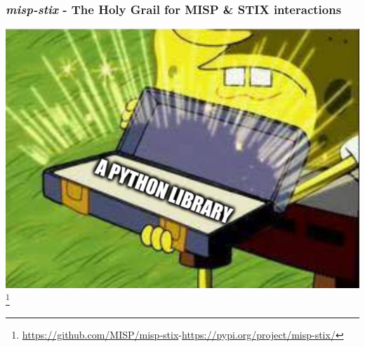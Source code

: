 \begin{frame}
\begin{minipage}{0.3\textwidth}
    \end{minipage}
\end{frame}

\begin{frame}
    \frametitle{\emph{misp-stix} - The Holy Grail for MISP \& STIX interactions}
    \centering
    \includegraphics[scale=0.3]{images/solution.png}\footnote{\url{https://github.com/MISP/misp-stix}\hspace{1em}-\hspace{1em}\url{https://pypi.org/project/misp-stix/}}
    \setcounter{footnote}{0}
\end{frame}


